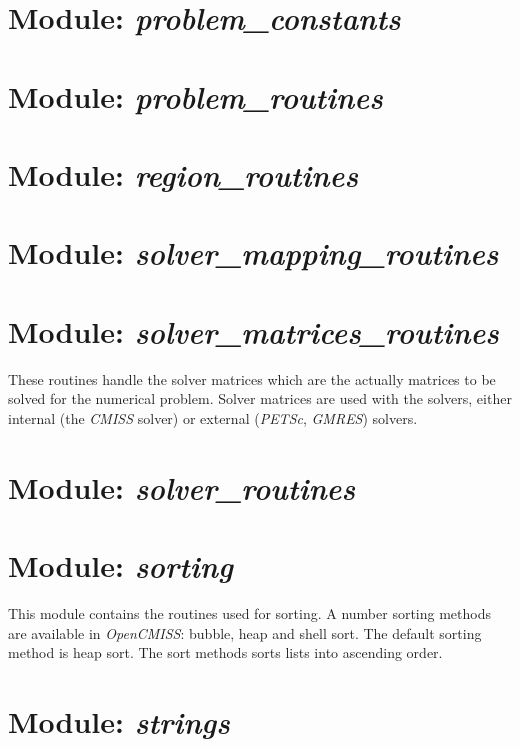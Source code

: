 \section{Module: \emph{problem\_constants}}
\label{sec:problemconstants}


\section{Module: \emph{problem\_routines}}
\label{sec:problemroutines}


\section{Module: \emph{region\_routines}}
\label{sec:regionroutines}


\section{Module: \emph{solver\_mapping\_routines}}
\label{sec:solvermappingroutines}


\section{Module: \emph{solver\_matrices\_routines}}
\label{sec:solvermatricesroutines}

These routines handle the solver matrices which are the actually matrices to 
be solved for the numerical problem. Solver matrices are used with the solvers, 
either internal (the \emph{CMISS} solver) or external (\emph{PETSc}, 
\emph{GMRES}) solvers.


\section{Module: \emph{solver\_routines}}
\label{sec:solverroutines}


\section{Module: \emph{sorting}}
\label{sec:sorting}

This module contains the routines used for sorting. A number sorting methods 
are available in \emph{OpenCMISS}: bubble, heap and shell sort. The default 
sorting method is heap sort. The sort methods sorts lists into ascending order. 


\section{Module: \emph{strings}}
\label{sec:strings}

